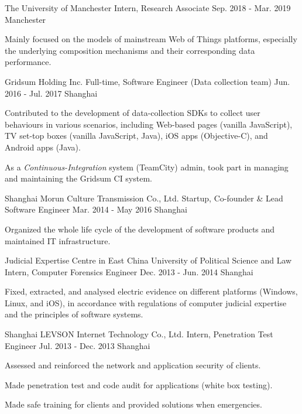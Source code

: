 \begin{cventries}
	  \cventry
	{The University of Manchester}
	{Intern, Research Associate}
	{Sep. 2018 - Mar. 2019}
	{Manchester}
	{
		\begin{cvitems}
			\item {Mainly focused on the models of mainstream Web of Things platforms, especially the underlying composition mechanisms and their corresponding data performance.}
		\end{cvitems}
	}

  \cventry
    {Gridsum Holding Inc.}
    {Full-time, Software Engineer (Data collection team)}
    {Jun. 2016 - Jul. 2017}
    {Shanghai}
    {
      \begin{cvitems}
        \item {Contributed to the development of data-collection SDKs to collect user behaviours in various scenarios, including Web-based pages (vanilla JavaScript), TV set-top boxes (vanilla JavaScript, Java), iOS apps (Objective-C), and Android apps (Java).}
        \item {As a \textit{Continuous-Integration} system (TeamCity) admin, took part in managing and maintaining the Gridsum CI system.}
      \end{cvitems}
    }
    
  \cventry
    {Shanghai Morun Culture Transmission Co., Ltd.}
    {Startup, Co-founder \& Lead Software Engineer}
    {Mar. 2014 - May 2016}
    {Shanghai}
    {
      \begin{cvitems}
        \item {Organized the whole life cycle of the development of software products and maintained IT infrastructure.}
      \end{cvitems}
    }
    
  \cventry
    {Judicial Expertise Centre in East China University of Political Science and Law}
    {Intern, Computer Forensics Engineer}
    {Dec. 2013 - Jun. 2014}
    {Shanghai}
    {
      \begin{cvitems}
        \item {Fixed, extracted, and analysed electric evidence on different platforms (Windows, Linux, and iOS), in accordance with regulations of computer judicial expertise and the principles of software systems.}
      \end{cvitems} 
    }
    
  \cventry
    {Shanghai LEVSON Internet Technology Co., Ltd.}
    {Intern, Penetration Test Engineer}
    {Jul. 2013 - Dec. 2013}
    {Shanghai}
    {
      \begin{cvitems}
        \item {Assessed and reinforced the network and application security of clients.}
        \item {Made penetration test and code audit for applications (white box testing).}
        \item {Made safe training for clients and provided solutions when emergencies.}
      \end{cvitems}
    }

\end{cventries}
